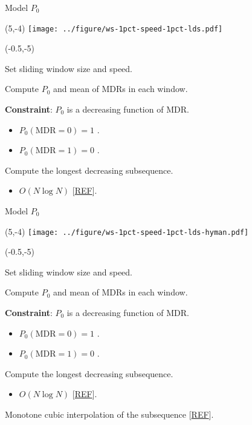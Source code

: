 \documentclass[aspectratio=169]{beamer}
\begin{document}
\begin{frame}{Model $P_0$}
\begin{textblock}{1}(5,-4)
\texttt{[image: ../figure/ws-1pct-speed-1pct-lds.pdf]}
\end{textblock}

\begin{textblock}{5}(-0.5,-5)

\small Set sliding window size and speed.\medskip

\small Compute $P_0$ and mean of MDRs in each window.\medskip

\small \textbf{Constraint}: $P_0$ is a decreasing function of MDR. 
\begin{itemize}
\small\item $P_0(\text{MDR}=0) = 1$ .

\small\item $P_0(\text{MDR}=1) = 0$ .
\end{itemize}\medskip

\small Compute the longest decreasing subsequence.
\begin{itemize}
\small \item $O(N\log N)$ [\textcolor{blue}{\href{https://en.wikipedia.org/wiki/Longest_increasing_subsequence}{REF}}].
\end{itemize}
\end{textblock}

\end{frame}


\begin{frame}{Model $P_0$}
\begin{textblock}{1}(5,-4)
\texttt{[image: ../figure/ws-1pct-speed-1pct-lds-hyman.pdf]}
\end{textblock}

\begin{textblock}{5}(-0.5,-5)

\small Set sliding window size and speed.\medskip

\small Compute $P_0$ and mean of MDRs in each window.\medskip

\textbf{Constraint}: $P_0$ is a decreasing function of MDR. 
\begin{itemize}
\item $P_0(\text{MDR}=0) = 1$ .

\item $P_0(\text{MDR}=1) = 0$ .
\end{itemize}\medskip

Compute the longest decreasing subsequence.
\begin{itemize}
\item $O(N\log N)$ [\textcolor{blue}{\href{https://en.wikipedia.org/wiki/Longest_increasing_subsequence}{REF}}].\medskip
\end{itemize}

Monotone cubic interpolation of the subsequence [\textcolor{blue}{\href{https://en.wikipedia.org/wiki/Monotone_cubic_interpolation}{REF}}].
\end{textblock}

\end{frame}
\end{document}
